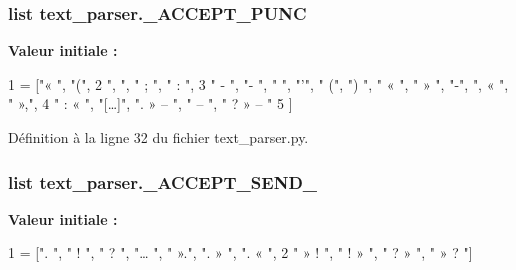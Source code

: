 \subsubsection[{\+\_\+\+A\+C\+C\+E\+P\+T\+\_\+\+P\+U\+N\+C}]{\setlength{\rightskip}{0pt plus 5cm}list text\+\_\+parser.\+\_\+\+A\+C\+C\+E\+P\+T\+\_\+\+P\+U\+N\+C}\label{namespacetext__parser_a8dc82f053dcb374290a6c60c48269593}
{\bfseries Valeur initiale \+:}
\begin{DoxyCode}
1 = [\textcolor{stringliteral}{"« "}, \textcolor{stringliteral}{"("},
2  \textcolor{stringliteral}{", "}, \textcolor{stringliteral}{" ; "}, \textcolor{stringliteral}{" : "},
3 \textcolor{stringliteral}{" - "}, \textcolor{stringliteral}{"- "}, \textcolor{stringliteral}{" "}, \textcolor{stringliteral}{"'"}, \textcolor{stringliteral}{" ("}, \textcolor{stringliteral}{") "}, \textcolor{stringliteral}{" « "}, \textcolor{stringliteral}{" » "}, \textcolor{stringliteral}{"-"}, \textcolor{stringliteral}{", « "}, \textcolor{stringliteral}{" »,"},
4 \textcolor{stringliteral}{" : « "}, \textcolor{stringliteral}{"[…]"}, \textcolor{stringliteral}{". » – "}, \textcolor{stringliteral}{" – "}, \textcolor{stringliteral}{" ? » – "}
5 ]
\end{DoxyCode}


Définition à la ligne 32 du fichier text\+\_\+parser.\+py.

\hypertarget{namespacetext__parser_a2423c0f051950ba04998599c28bb9ee5}{}
\subsubsection[{\+\_\+\+A\+C\+C\+E\+P\+T\+\_\+\+S\+E\+N\+D\+\_\+1}]{\setlength{\rightskip}{0pt plus 5cm}list text\+\_\+parser.\+\_\+\+A\+C\+C\+E\+P\+T\+\_\+\+S\+E\+N\+D\+\_}\label{namespacetext__parser_a2423c0f051950ba04998599c28bb9ee5}
{\bfseries Valeur initiale \+:}
\begin{DoxyCode}
1 = [\textcolor{stringliteral}{". "}, \textcolor{stringliteral}{" ! "}, \textcolor{stringliteral}{" ? "}, \textcolor{stringliteral}{"… "}, \textcolor{stringliteral}{" »."}, \textcolor{stringliteral}{". » "}, \textcolor{stringliteral}{". « "},
2 \textcolor{stringliteral}{" » ! "}, \textcolor{stringliteral}{" ! » "}, \textcolor{stringliteral}{" ? » "}, \textcolor{stringliteral}{" » ? "}]
\end{DoxyCode}


